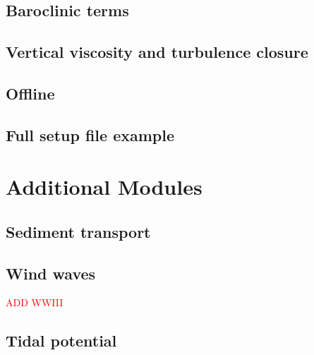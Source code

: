 \documentclass{report}
\begin{document}

	\section{Baroclinic terms}
	

	\section{Vertical viscosity and turbulence closure}
	

	\section{Offline}
	

	\section{Full setup file example}
	


\chapter{Additional Modules}

	\section{Sediment transport}
	

	\section{Wind waves}\textcolor{red}{ADD WWIII}
	

	\section{Tidal potential}
	
\end{document}
